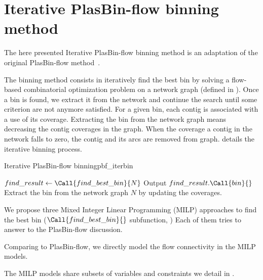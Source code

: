 \section{Iterative PlasBin-flow binning method}\label{sec:pbf_iterbin}

The here presented Iterative PlasBin-flow binning method is an adaptation of the original PlasBin-flow method~\cite{manePlasBinflowFlowbasedMILP2023}.

The binning method consists in iteratively find the best bin by solving a flow-based combinatorial optimization problem on a network graph (defined in ).
Once a bin is found, we extract it from the network and continue the search until some criterion are not anymore satisfied.
For a given bin, each contig is associated with a use of its coverage.
Extracting the bin from the network graph means decreasing the contig coverages in the graph.
When the coverage a contig in the network falls to zero, the contig and its arcs are removed from graph.
 details the iterative binning process.

\begin{tcbalgo}{Iterative PlasBin-flow binning}{pbf_iterbin}
  \begin{algorithmic}[1]
    \State{} \( find\_result \gets \Call{find\_best\_bin}{ N } \)
    \State{} Output \( find\_result.\Call{bin}{ } \)
    \State{} Extract the bin from the network graph \(N\) by updating the coverages.
    \EndIf{}
    \EndWhile{}
    \EndFunction{}
  \end{algorithmic}
\end{tcbalgo}

We propose three Mixed Integer Linear Programming (MILP) approaches to find the best bin (\( \Call{find\_best\_bin}{} \) subfunction, )
Each of them tries to answer to the PlasBin-flow discussion.

\begin{newfeatbox}
  Comparing to PlasBin-flow, we directly model the flow connectivity in the MILP models.
\end{newfeatbox}

The MILP models share subsets of variables and constraints we detail in .

%
%




%
%






%
%
